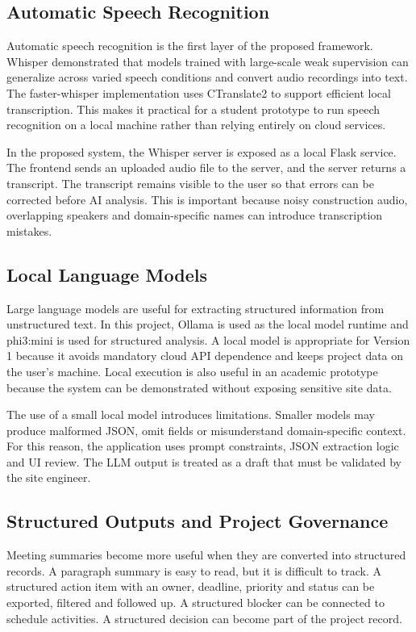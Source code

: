 \documentclass[11pt,a4paper]{article}
\begin{document}
\subsection{Automatic Speech Recognition}

Automatic speech recognition is the first layer of the proposed framework. Whisper demonstrated that models trained with large-scale weak supervision can generalize across varied speech conditions and convert audio recordings into text. The faster-whisper implementation uses CTranslate2 to support efficient local transcription. This makes it practical for a student prototype to run speech recognition on a local machine rather than relying entirely on cloud services.

In the proposed system, the Whisper server is exposed as a local Flask service. The frontend sends an uploaded audio file to the server, and the server returns a transcript. The transcript remains visible to the user so that errors can be corrected before AI analysis. This is important because noisy construction audio, overlapping speakers and domain-specific names can introduce transcription mistakes.

\subsection{Local Language Models}

Large language models are useful for extracting structured information from unstructured text. In this project, Ollama is used as the local model runtime and phi3:mini is used for structured analysis. A local model is appropriate for Version 1 because it avoids mandatory cloud API dependence and keeps project data on the user's machine. Local execution is also useful in an academic prototype because the system can be demonstrated without exposing sensitive site data.

The use of a small local model introduces limitations. Smaller models may produce malformed JSON, omit fields or misunderstand domain-specific context. For this reason, the application uses prompt constraints, JSON extraction logic and UI review. The LLM output is treated as a draft that must be validated by the site engineer.

\subsection{Structured Outputs and Project Governance}

Meeting summaries become more useful when they are converted into structured records. A paragraph summary is easy to read, but it is difficult to track. A structured action item with an owner, deadline, priority and status can be exported, filtered and followed up. A structured blocker can be connected to schedule activities. A structured decision can become part of the project record.
\end{document}

